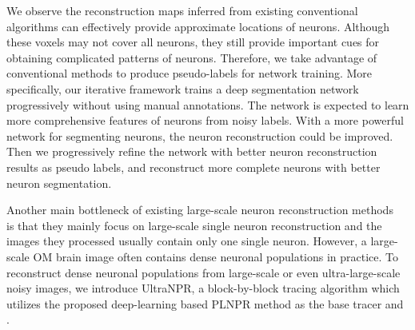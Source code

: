 We observe the reconstruction maps inferred from existing conventional algorithms can effectively provide approximate locations of neurons. Although these voxels may not cover all neurons, they still provide important cues for obtaining complicated patterns of neurons.
Therefore, we take advantage of conventional methods to produce pseudo-labels for network training.
More specifically, our iterative framework trains a deep segmentation network progressively without using manual annotations. The network is expected to learn more comprehensive features of neurons from noisy labels. With a more powerful network for segmenting neurons, the neuron reconstruction could be improved. Then we progressively refine the network with better neuron reconstruction results as pseudo labels, and reconstruct more complete neurons with better neuron segmentation.

Another main bottleneck of existing large-scale neuron reconstruction methods~\cite{Zhou2015, Peng2017, Wang2018} is that they mainly focus on large-scale single neuron reconstruction and the images they processed usually contain only one single neuron. However, a large-scale OM brain image often contains dense neuronal populations in practice.
%
To reconstruct dense neuronal populations from large-scale or even ultra-large-scale noisy images, we introduce UltraNPR, a block-by-block tracing algorithm which utilizes the proposed deep-learning based PLNPR method as the base tracer and .
%


